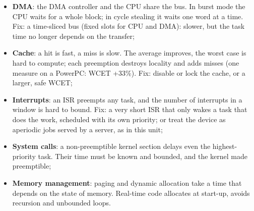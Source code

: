 \documentclass[a4paper,11pt]{article}
\begin{document}
\begin{itemize}
	\item \textbf{DMA}: the DMA controller and the CPU share the bus. In burst mode the CPU waits for a whole block; in cycle stealing it waits one word at a time. Fix: a time-sliced bus (fixed slots for CPU and DMA): slower, but the task time no longer depends on the transfer;

	\item \textbf{Cache}: a hit is fast, a miss is slow. The average improves, the worst case is hard to compute; each preemption destroys locality and adds misses (one measure on a PowerPC: WCET +33\%). Fix: disable or lock the cache, or a larger, safe WCET;

	\item \textbf{Interrupts}: an ISR preempts any task, and the number of interrupts in a window is hard to bound. Fix: a very short ISR that only wakes a task that does the work, scheduled with its own priority; or treat the device as aperiodic jobs served by a server, as in this unit;

	\item \textbf{System calls}: a non-preemptible kernel section delays even the highest-priority task. Their time must be known and bounded, and the kernel made preemptible;

	\item \textbf{Memory management}: paging and dynamic allocation take a time that depends on the state of memory. Real-time code allocates at start-up, avoids recursion and unbounded loops.
\end{itemize}
\end{document}
